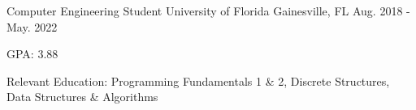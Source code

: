 \begin{cventries}
  \cventry
	{Computer Engineering Student}
	{University of Florida}
	{Gainesville, FL}
	{Aug. 2018 - May. 2022}
	{
		\begin{cvitems}
			\item {GPA: 3.88}
			\item {Relevant Education: Programming Fundamentals 1 \& 2, Discrete Structures, Data Structures \& Algorithms}
		\end{cvitems}
	}
\end{cventries}
